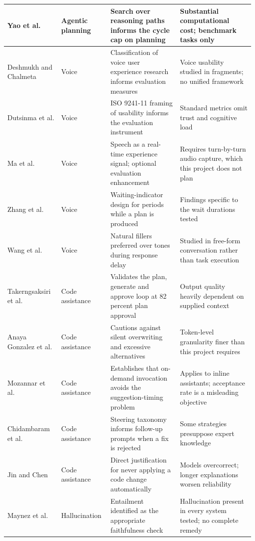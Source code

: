 \documentclass{FastFyp}
\begin{document}
{\begin{longtable}{|p{2.6cm}|p{2.0cm}|p{3.6cm}|p{4.6cm}|}
\hline
Yao et al. \cite{ref:yao2023tot} & Agentic planning & Search over reasoning paths informs the cycle cap on planning & Substantial computational cost; benchmark tasks only \\
\hline
Deshmukh and Chalmeta \cite{ref:deshmukh2024} & Voice & Classification of voice user experience research informs evaluation measures & Voice usability studied in fragments; no unified framework \\
\hline
Dutsinma et al. \cite{ref:dutsinma2022} & Voice & ISO 9241-11 framing of usability informs the evaluation instrument & Standard metrics omit trust and cognitive load \\
\hline
Ma et al. \cite{ref:ma2026} & Voice & Speech as a real-time experience signal; optional evaluation enhancement & Requires turn-by-turn audio capture, which this project does not plan \\
\hline
Zhang et al. \cite{ref:zhang2025} & Voice & Waiting-indicator design for periods while a plan is produced & Findings specific to the wait durations tested \\
\hline
Wang et al. \cite{ref:wang2025} & Voice & Natural fillers preferred over tones during response delay & Studied in free-form conversation rather than task execution \\
\hline
Takerngsaksiri et al. \cite{ref:takerngsaksiri2025} & Code assistance & Validates the plan, generate and approve loop at 82 percent plan approval & Output quality heavily dependent on supplied context \\
\hline
Anaya Gonzalez et al. \cite{ref:gonzalez2025} & Code assistance & Cautions against silent overwriting and excessive alternatives & Token-level granularity finer than this project requires \\
\hline
Mozannar et al. \cite{ref:mozannar2024} & Code assistance & Establishes that on-demand invocation avoids the suggestion-timing problem & Applies to inline assistants; acceptance rate is a misleading objective \\
\hline
Chidambaram et al. \cite{ref:chidambaram2024} & Code assistance & Steering taxonomy informs follow-up prompts when a fix is rejected & Some strategies presuppose expert knowledge \\
\hline
Jin and Chen \cite{ref:jin2026} & Code assistance & Direct justification for never applying a code change automatically & Models overcorrect; longer explanations worsen reliability \\
\hline
Maynez et al. \cite{ref:maynez2020} & Hallucination & Entailment identified as the appropriate faithfulness check & Hallucination present in every system tested; no complete remedy \\

\end{longtable}}
\end{document}
